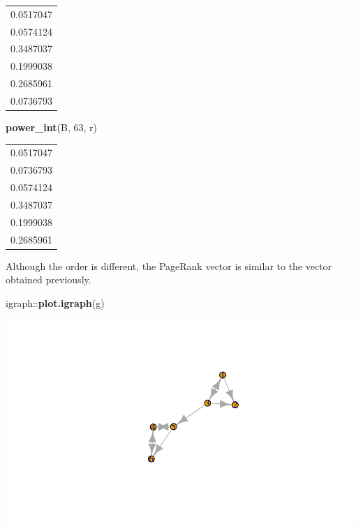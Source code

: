 \documentclass[]{article}
\newenvironment{Shaded}{\begin{snugshade}}{\end{snugshade}}
\newcommand{\KeywordTok}[1]{\textcolor[rgb]{0.13,0.29,0.53}{\textbf{{#1}}}}
\newcommand{\DecValTok}[1]{\textcolor[rgb]{0.00,0.00,0.81}{{#1}}}
\newcommand{\NormalTok}[1]{{#1}}
\begin{document}
\begin{longtable}[]{@{}r@{}}
\toprule
0.0517047\tabularnewline
0.0574124\tabularnewline
0.3487037\tabularnewline
0.1999038\tabularnewline
0.2685961\tabularnewline
0.0736793\tabularnewline
\bottomrule
\end{longtable}

\begin{Shaded}
\begin{Highlighting}[]
\KeywordTok{power_int}\NormalTok{(B, }\DecValTok{63}\NormalTok{, r)}
\end{Highlighting}
\end{Shaded}

\begin{longtable}[]{@{}r@{}}
\toprule
0.0517047\tabularnewline
0.0736793\tabularnewline
0.0574124\tabularnewline
0.3487037\tabularnewline
0.1999038\tabularnewline
0.2685961\tabularnewline
\bottomrule
\end{longtable}

Although the order is different, the PageRank vector is similar to the
vector obtained previously.

\begin{Shaded}
\begin{Highlighting}[]
\NormalTok{igraph::}\KeywordTok{plot.igraph}\NormalTok{(g)}
\end{Highlighting}
\end{Shaded}

\includegraphics{CHunt_Assign10_PS1_files/figure-latex/unnamed-chunk-13-1.pdf}
\end{document}
